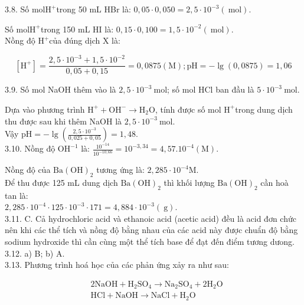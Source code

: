 \documentclass[10pt]{article}
\begin{document}
3.8. Số $\mathrm{mol} \mathrm{H}^{+}$trong 50 mL HBr là: $0,05 \cdot 0,050=2,5 \cdot 10^{-3}(\mathrm{~mol})$.

Số $\mathrm{mol} \mathrm{H}^{+}$trong 150 mL HI là: $0,15 \cdot 0,100=1,5 \cdot 10^{-2}(\mathrm{~mol})$.\\
Nồng độ $\mathrm{H}^{+}$của đúng dịch X là:

$$
\left[\mathrm{H}^{+}\right]=\frac{2,5 \cdot 10^{-3}+1,5 \cdot 10^{-2}}{0,05+0,15}=0,0875(\mathrm{M}) ; \mathrm{pH}=-\lg (0,0875)=1,06
$$

3.9. Số mol NaOH thêm vào là $2,5 \cdot 10^{-3} \mathrm{~mol}$; số mol HCl ban đầu là $5 \cdot 10^{-3} \mathrm{~mol}$.

Dựa vào phương trình $\mathrm{H}^{+}+\mathrm{OH}^{-} \rightarrow \mathrm{H}_{2} \mathrm{O}$, tính được số mol $\mathrm{H}^{+}$trong dung dịch thu được sau khi thêm NaOH là $2,5 \cdot 10^{-3} \mathrm{~mol}$.\\
Vậy $\mathrm{pH}=-\lg \left(\frac{2,5 \cdot 10^{-3}}{0,025+0,05}\right)=1,48$.\\
3.10. Nồng độ $\mathrm{OH}^{-1}$ là: $\frac{10^{-14}}{10^{-10,66}}=10^{-3,34}=4,57.10^{-4}(\mathrm{M})$.

Nồng độ của $\mathrm{Ba}(\mathrm{OH})_{2}$ tương ứng là: $2,285 \cdot 10^{-4} \mathrm{M}$.\\
Để thu được 125 mL dung dịch $\mathrm{Ba}(\mathrm{OH})_{2}$ thì khối lượng $\mathrm{Ba}(\mathrm{OH})_{2}$ cần hoà tan là:\\
$2,285 \cdot 10^{-4} \cdot 125 \cdot 10^{-3} \cdot 171=4,884 \cdot 10^{-3}(\mathrm{~g})$.\\
3.11. C. Cả hydrochloric acid và ethanoic acid (acetic acid) đều là acid đơn chức nên khi các thể tích và nồng độ bằng nhau của các acid này được chuẩn độ bằng sodium hydroxide thì cần cùng một thể tích base để đạt đến điểm tương dưong.\\
3.12. a) B; b) A.\\
3.13. Phương trình hoá học của các phản ứng xảy ra như sau:

$$
\begin{aligned}
& 2 \mathrm{NaOH}+\mathrm{H}_{2} \mathrm{SO}_{4} \rightarrow \mathrm{Na}_{2} \mathrm{SO}_{4}+2 \mathrm{H}_{2} \mathrm{O} \\
& \mathrm{HCl}+\mathrm{NaOH} \rightarrow \mathrm{NaCl}+\mathrm{H}_{2} \mathrm{O}
\end{aligned}
$$
\end{document}
